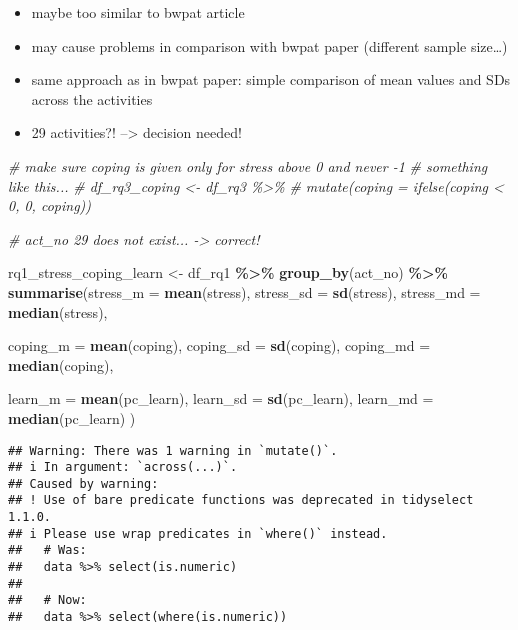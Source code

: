 \documentclass[
]{article}
\newenvironment{Shaded}{\begin{snugshade}}{\end{snugshade}}
\newcommand{\AttributeTok}[1]{\textcolor[rgb]{0.13,0.29,0.53}{#1}}
\newcommand{\CommentTok}[1]{\textcolor[rgb]{0.56,0.35,0.01}{\textit{#1}}}
\newcommand{\FunctionTok}[1]{\textcolor[rgb]{0.13,0.29,0.53}{\textbf{#1}}}
\newcommand{\NormalTok}[1]{#1}
\newcommand{\OtherTok}[1]{\textcolor[rgb]{0.56,0.35,0.01}{#1}}
\newcommand{\SpecialCharTok}[1]{\textcolor[rgb]{0.81,0.36,0.00}{\textbf{#1}}}
\providecommand{\tightlist}{%
  \setlength{\itemsep}{0pt}\setlength{\parskip}{0pt}}
\begin{document}
\begin{itemize}
\tightlist
\item
  maybe too similar to bwpat article
\item
  may cause problems in comparison with bwpat paper (different sample
  size\ldots)
\item
  same approach as in bwpat paper: simple comparison of mean values and
  SDs across the activities
\item
  29 activities?! --\textgreater{} decision needed!
\end{itemize}

\begin{Shaded}
\begin{Highlighting}[]
\CommentTok{\# make sure coping is given only for stress above 0 and never {-}1}
\CommentTok{\# something like this...}
\CommentTok{\# df\_rq3\_coping \textless{}{-} df\_rq3 \%\textgreater{}\%}
\CommentTok{\#  mutate(coping = ifelse(coping \textless{} 0, 0, coping))}

\CommentTok{\# act\_no 29 does not exist... {-}\textgreater{} correct!}

\NormalTok{rq1\_stress\_coping\_learn }\OtherTok{\textless{}{-}}\NormalTok{ df\_rq1 }\SpecialCharTok{\%\textgreater{}\%}
  \FunctionTok{group\_by}\NormalTok{(act\_no) }\SpecialCharTok{\%\textgreater{}\%}
  \FunctionTok{summarise}\NormalTok{(}\AttributeTok{stress\_m =} \FunctionTok{mean}\NormalTok{(stress), }
            \AttributeTok{stress\_sd =} \FunctionTok{sd}\NormalTok{(stress), }
            \AttributeTok{stress\_md =} \FunctionTok{median}\NormalTok{(stress), }
            
            \AttributeTok{coping\_m =} \FunctionTok{mean}\NormalTok{(coping), }
            \AttributeTok{coping\_sd =} \FunctionTok{sd}\NormalTok{(coping), }
            \AttributeTok{coping\_md =} \FunctionTok{median}\NormalTok{(coping), }
            
            \AttributeTok{learn\_m =} \FunctionTok{mean}\NormalTok{(pc\_learn), }
            \AttributeTok{learn\_sd =} \FunctionTok{sd}\NormalTok{(pc\_learn), }
            \AttributeTok{learn\_md =} \FunctionTok{median}\NormalTok{(pc\_learn)}
\NormalTok{            )}
\end{Highlighting}
\end{Shaded}

\begin{verbatim}
## Warning: There was 1 warning in `mutate()`.
## i In argument: `across(...)`.
## Caused by warning:
## ! Use of bare predicate functions was deprecated in tidyselect 1.1.0.
## i Please use wrap predicates in `where()` instead.
##   # Was:
##   data %>% select(is.numeric)
## 
##   # Now:
##   data %>% select(where(is.numeric))
\end{verbatim}
\end{document}
